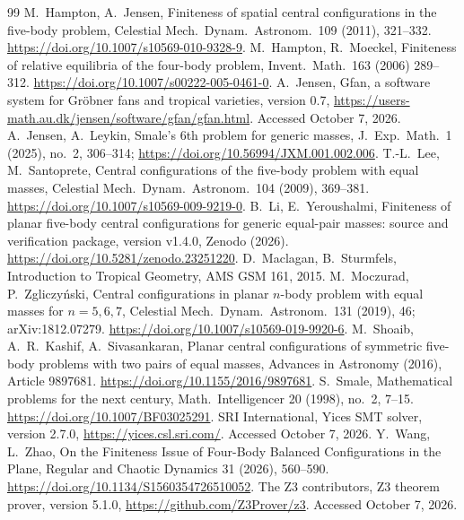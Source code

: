 \documentclass[11pt]{amsart}
\theoremstyle{definition}\newtheorem{definition}[theorem]{Definition}\theoremstyle{remark}\newtheorem{remark}[theorem]{Remark}
\begin{document}
\begin{thebibliography}{99}
 M.~Hampton, A.~Jensen, Finiteness of spatial central configurations in the five-body problem, Celestial Mech.\ Dynam.\ Astronom.\ 109 (2011), 321--332. \url{https://doi.org/10.1007/s10569-010-9328-9}.
 M.~Hampton, R.~Moeckel, Finiteness of relative equilibria of the four-body problem, Invent.\ Math.\ 163 (2006) 289--312. \url{https://doi.org/10.1007/s00222-005-0461-0}.
 A.~Jensen, Gfan, a software system for Gr\"obner fans and tropical varieties, version 0.7, \url{https://users-math.au.dk/jensen/software/gfan/gfan.html}. Accessed October 7, 2026.
 A.~Jensen, A.~Leykin, Smale's 6th problem for generic masses, J.\ Exp.\ Math.\ 1 (2025), no.~2, 306--314; \url{https://doi.org/10.56994/JXM.001.002.006}.
 T.-L.~Lee, M.~Santoprete, Central configurations of the five-body problem with equal masses, Celestial Mech.\ Dynam.\ Astronom.\ 104 (2009), 369--381. \url{https://doi.org/10.1007/s10569-009-9219-0}.
 B.~Li, E.~Yeroushalmi, Finiteness of planar five-body central configurations for generic equal-pair masses: source and verification package, version v1.4.0, Zenodo (2026). \url{https://doi.org/10.5281/zenodo.23251220}.
 D.~Maclagan, B.~Sturmfels, Introduction to Tropical Geometry, AMS GSM 161, 2015.
 M.~Moczurad, P.~Zgliczy\'nski, Central configurations in planar $n$-body problem with equal masses for $n=5,6,7$, Celestial Mech.\ Dynam.\ Astronom.\ 131 (2019), 46; arXiv:1812.07279. \url{https://doi.org/10.1007/s10569-019-9920-6}.
 M.~Shoaib, A.~R.~Kashif, A.~Sivasankaran, Planar central configurations of symmetric five-body problems with two pairs of equal masses, Advances in Astronomy (2016), Article 9897681. \url{https://doi.org/10.1155/2016/9897681}.
 S.~Smale, Mathematical problems for the next century, Math.\ Intelligencer 20 (1998), no.~2, 7--15. \url{https://doi.org/10.1007/BF03025291}.
 SRI International, Yices SMT solver, version 2.7.0, \url{https://yices.csl.sri.com/}. Accessed October 7, 2026.
 Y.~Wang, L.~Zhao, On the Finiteness Issue of Four-Body Balanced Configurations in the Plane, Regular and Chaotic Dynamics 31 (2026), 560--590. \url{https://doi.org/10.1134/S1560354726510052}.
 The Z3 contributors, Z3 theorem prover, version 5.1.0, \url{https://github.com/Z3Prover/z3}. Accessed October 7, 2026.
\end{thebibliography}
\end{document}
